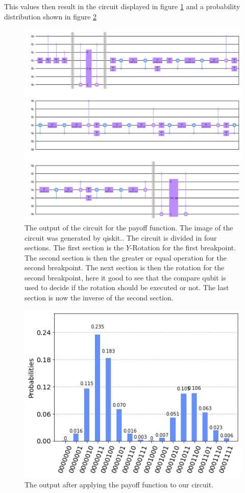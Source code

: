 This values then result in the circuit displayed in figure \ref{fig:E_model_payoff_function} and a probability distribution shown in figure \ref{fig:E_probability_estimate}
 
\begin{figure}[H]
  \begin{center}
    \includegraphics[width=\linewidth]{images/model.png}
  \end{center}
  \caption{The output of the circuit for the payoff function. The image of the circuit was generated by qiskit.\cite{Qiskit}. The circuit is divided in four sections. The first section is the $Y$-Rotation for the first breakpoint. The second section is then the greater or equal operation for the second breakpoint. The next section is then the rotation for the second breakpoint, here it good to see that the compare qubit is used to decide if the rotation should be executed or not. The last section is now the inverse of the second section.}
  \label{fig:E_model_payoff_function}
\end{figure}

 \begin{figure}[H]
  \begin{center}
    \includegraphics[width=0.5\linewidth]{images/probability_estimate.png}
  \end{center}
  \caption{The output after applying the payoff function to our circuit.}
  \label{fig:E_probability_estimate}
\end{figure}

